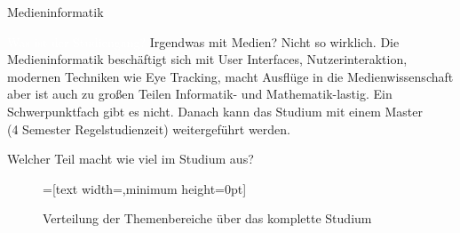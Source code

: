 
\begin{Huge}
    Medieninformatik
\end{Huge}

\begin{exampleblock}{\textcolor{white}{Was ist der Studiengang?}}
    Irgendwas mit Medien? Nicht so wirklich. Die Medieninformatik beschäftigt sich mit User Interfaces, Nutzerinteraktion, modernen Techniken wie Eye Tracking, macht Ausflüge in die Medienwissenschaft aber ist auch zu großen Teilen Informatik- und Mathematik-lastig. Ein Schwerpunktfach gibt es nicht. Danach kann das Studium mit einem Master \\ (4 Semester Regelstudienzeit) weitergeführt werden.
\end{exampleblock}

\begin{block}{Welcher Teil macht wie viel im Studium aus?}
    \begin{figure}[h!]
        \begin{minipage}{\linewidth}
            \centering
            =[text width={},minimum height=0pt]
        \end{minipage}
        \caption{Verteilung der Themenbereiche über das komplette Studium}
    \end{figure}
\end{block}

